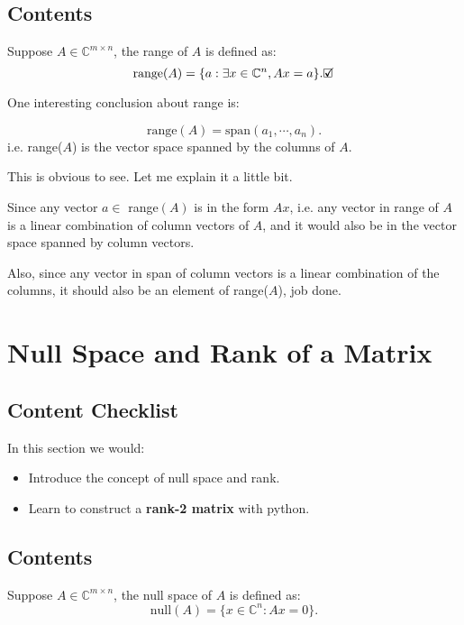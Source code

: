 \subsection*{Contents}
\begin{definition}
  Suppose \(A \in \mathbb{C}^{m \times n}\), the range of \(A\) is defined as:
  \[
  \text{range}(A) = \{a : \exists x \in \mathbb{C}^{n}, Ax = a \}
  .\checked\]
\end{definition}
One interesting conclusion about range is:
\begin{prop}
  \[
    \text{range}(A) = \text{span}(a_1, \cdots, a_n)
  .\] 
  i.e. range($A$) is the vector space spanned by the columns of $A$.
\end{prop}
This is obvious to see. Let me explain it a little bit. 

\noindent Since any vector \(a \in\) range\((A)\)  is in the form \(Ax\), i.e. any vector in range of \(A\)  is a linear combination of column vectors of \(A\), and it would also be in the vector space spanned by column vectors.

\noindent Also, since any vector in span of column vectors is a linear combination of the columns, it should also be an element of range($A$), job done. \checked


\section{Null Space and Rank of a Matrix}%
\label{sec1.5}
\subsection*{Content Checklist}
\noindent In this section we would:
\begin{itemize}
  \item Introduce the concept of null space and rank.
  \item Learn to construct a \textbf{rank-2 matrix} with python.
\end{itemize}
\subsection*{Contents}
\begin{definition}
  Suppose \(A \in \mathbb{C}^{m \times n}\), the null space of \(A\) is defined as:
  \[
    \text{null}(A) = \{x \in \mathbb{C}^{n}: Ax = 0\} 
  .\]
\end{definition}

